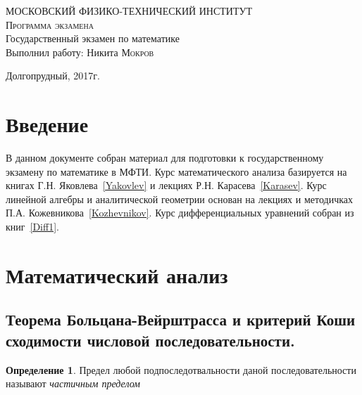 \documentclass{urticle}
\theoremstyle{definition}
\newtheorem{definition}{Определение}
\begin{document}
\begin{titlepage}

    \begin{center}
        \large МОСКОВСКИЙ ФИЗИКО-ТЕХНИЧЕСКИЙ ИНСТИТУТ
        \vspace{2cm}\\
        \textsc{Программа экзамена}
        \vspace{8cm}\\
        \LARGE Государственный экзамен по математике
        \vspace{3cm}\\
        \large Выполнил работу: Никита \textsc{Мокров}
    \end{center}

    \vfill
    \center Долгопрудный, 2017г.
\end{titlepage}

\tableofcontents
\newpage

\section*{Введение}
\label{Intro}
    В данном документе собран материал для подготовки к государственному экзамену по математике в МФТИ. Курс математического анализа базируется на книгах Г.Н. Яковлева~\ref{Yakovlev} и лекциях Р.Н. Карасева~\ref{Karasev}. Курс линейной алгебры и аналитической геометрии основан на лекциях и методичках П.А. Кожевникова~\ref{Kozhevnikov}. Курс дифференциальных уравнений собран из книг~\ref{Diff1}.

\section{Математический анализ}
\label{MathAnalysis}

\subsection{Теорема Больцана-Вейрштрасса и критерий Коши сходимости числовой последовательности.}
    
    \begin{definition}
    \label{def:PartialLimit}
        Предел любой подпоследотвальности даной последовательности называют \textit{частичным пределом}
    \end{definition}    
    
\end{document}

